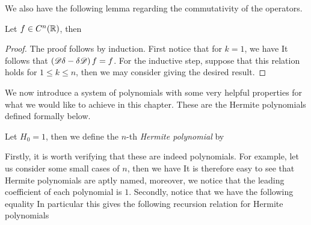 \documentclass[../main.tex]{subfiles}
\begin{document}
We also have the following lemma regarding the commutativity of the operators.
\begin{lemma}
\label{lem:1d_operator_comm}
Let $f\in C^n(\operatorname{\mathbb{R}})$, then 
\end{lemma}
\begin{proof}
The proof follows by induction. First notice that for $k = 1$, we have  It follows that $\del{\Dif\delta - \delta\Dif}f = f$. For the inductive step, suppose that this relation holds for $1\leq k\leq n$, then we may consider  giving the desired result.
\end{proof}

We now introduce a system of polynomials with some very helpful properties for what we would like to achieve in this chapter. These are the Hermite polynomials defined formally below.
\begin{definition}
\label{def:1d_hermite}
Let $H_0 = 1$, then we define the $n$-th \emph{Hermite polynomial} by 
\end{definition}
Firstly, it is worth verifying that these are indeed polynomials. For example, let us consider some small cases of $n$, then we have  It is therefore easy to see that Hermite polynomials are aptly named, moreover, we notice that the leading coefficient of each polynomial is $1$. Secondly, notice that we have the following equality  In particular this gives the following recursion relation for Hermite polynomials 
\end{document}
